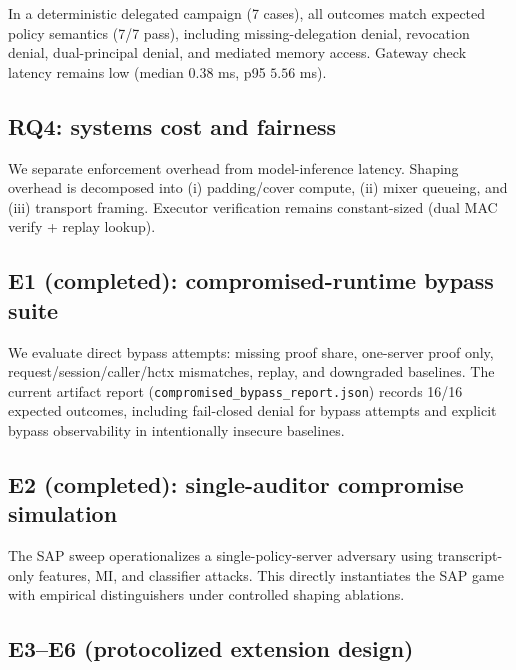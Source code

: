 In a deterministic delegated campaign (7 cases), all outcomes match expected policy semantics (7/7 pass), including missing-delegation denial, revocation denial, dual-principal denial, and mediated memory access.
Gateway check latency remains low (median $0.38$ ms, p95 $5.56$ ms).

\subsection{RQ4: systems cost and fairness}
\label{sec:rq4}

We separate enforcement overhead from model-inference latency.
Shaping overhead is decomposed into (i) padding/cover compute, (ii) mixer queueing, and (iii) transport framing.
Executor verification remains constant-sized (dual MAC verify + replay lookup).

\subsection{E1 (completed): compromised-runtime bypass suite}
\label{sec:e1}

We evaluate direct bypass attempts: missing proof share, one-server proof only, request/session/caller/hctx mismatches, replay, and downgraded baselines.
The current artifact report (\texttt{compromised\_bypass\_report.json}) records 16/16 expected outcomes, including fail-closed denial for bypass attempts and explicit bypass observability in intentionally insecure baselines.

\subsection{E2 (completed): single-auditor compromise simulation}
\label{sec:e2}

The SAP sweep operationalizes a single-policy-server adversary using transcript-only features, MI, and classifier attacks.
This directly instantiates the SAP game with empirical distinguishers under controlled shaping ablations.

\subsection{E3--E6 (protocolized extension design)}
\label{sec:e3e6}

